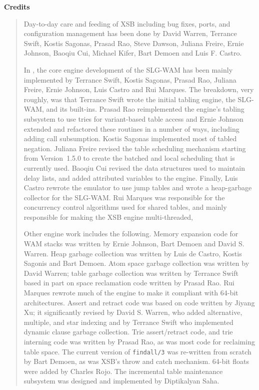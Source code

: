 \begin{center}
{\bf {\Large 
		Credits
}}
\end{center}


\begin{quote}
Day-to-day care and feeding of XSB including bug fixes, ports, and
configuration management has been done by David Warren, Terrance
Swift, Kostis Sagonas, Prasad Rao, Steve Dawson, Juliana Freire, Ernie
Johnson, Baoqiu Cui, Michael Kifer, Bart Demoen and Luis F.  Castro.

In \version, the core engine development of the SLG-WAM has been
mainly implemented by Terrance Swift, Kostis Sagonas, Prasad Rao,
Juliana Freire, Ernie Johnson, Luis Castro and Rui Marques.  The
breakdown, very roughly, was that Terrance Swift wrote the initial
tabling engine, the SLG-WAM, and its built-ins.  Prasad Rao
reimplemented the engine's tabling subsystem to use tries for
variant-based table access and Ernie Johnson extended and refactored
these routines in a number of ways, including adding call subsumption.
Kostis Sagonas implemented most of tabled negation.  Juliana Freire
revised the table scheduling mechanism starting from Version~1.5.0 to
create the batched and local scheduling that is currently used.
Baoqiu Cui revised the data structures used to maintain delay lists,
and added attributed variables to the engine.  Finally, Luis Castro
rewrote the emulator to use jump tables and wrote a heap-garbage
collector for the SLG-WAM.  Rui Marques was responsible for the
concurrency control algorithms used for shared tables, and mainly
responsible for making the XSB engine multi-threaded,

Other engine work includes the following.  Memory expansion code for
WAM stacks was written by Ernie Johnson, Bart Demoen and David
S. Warren.  Heap garbage collection was written by Luis de Castro,
Kostis Sagonis and Bart Demoen.  Atom space garbage collection was
written by David Warren; table garbage collection was written by
Terrance Swift based in part on space reclamation code written by
Prasad Rao.  Rui Marques rewrote much of the engine to make it
compliant with 64-bit architectures.  Assert and retract code was
based on code written by Jiyang Xu; it significantly revised by David
S. Warren, who added alternative, multiple, and star indexing and by
Terrance Swift who implemented dynamic clause garbage collection. Trie
assert/retract code, and trie interning code was written by Prasad
Rao, as was most code for reclaiming table space. The current version
of {\tt findall/3} was re-written from scratch by Bart Demoen, as was
XSB's throw and catch mechanism.  64-bit floats were added by Charles
Rojo.  The incremental table maintenance subsystem was designed and
implemented by Diptikalyan Saha.


\end{quote}
